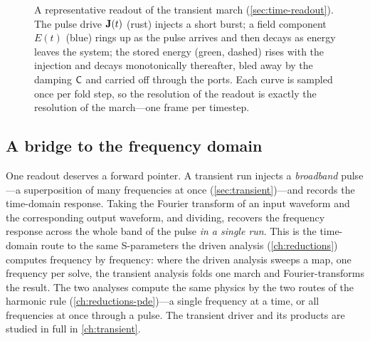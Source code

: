 \begin{figure}[t]
\centering
{}
\caption[A transient field and energy trajectory]{A representative readout of the
transient march (\cref{sec:time-readout}). The pulse drive $\mathbf{J}(t)$ (rust) injects
a short burst; a field component $E(t)$ (blue) rings up as the pulse arrives and
then decays as energy leaves the system; the stored energy (green, dashed) rises
with the injection and decays monotonically thereafter, bled away by the damping
$\mathsf{C}$ and carried off through the ports. Each curve is sampled once per fold step,
so the resolution of the readout is exactly the resolution of the march---one frame
per timestep.}
\label{fig:energy}
\end{figure}

\subsection{A bridge to the frequency domain}

One readout deserves a forward pointer. A transient run injects a \emph{broadband}
pulse---a superposition of many frequencies at once (\cref{sec:transient})---and
records the time-domain response. Taking the Fourier transform of an input
waveform and the corresponding output waveform, and dividing, recovers the
frequency response across the whole band of the pulse \emph{in a single run}. This
is the time-domain route to the same S-parameters the driven analysis
(\cref{ch:reductions}) computes frequency by frequency: where the driven analysis
sweeps a  map, one frequency per solve, the transient
analysis folds one march and Fourier-transforms the result. The two analyses
compute the same physics by the two routes of the harmonic rule
(\cref{ch:reductions-pde})---a single frequency at a time, or all frequencies at
once through a pulse. The transient driver and its products are studied in full in
\cref{ch:transient}.

